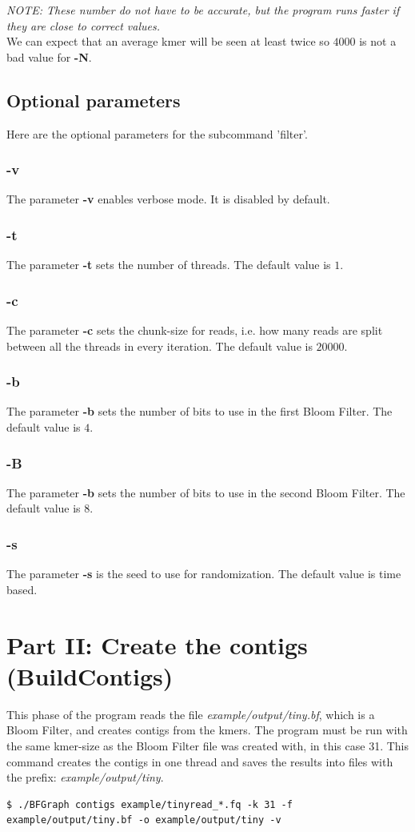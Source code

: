 \documentclass[a4paper]{report}
\renewcommand{\b}[1]{\textbf{#1}}  %
\newcommand{\e}[1]{\emph{#1}}    %
\begin{document}
\textit{NOTE: These number do not have to be accurate, but the program runs faster if they are close to correct values.} \\[4pt]

We can expect that an average kmer will be seen at least twice so $4000$ is not a bad value for \b{-N}.

\subsection{Optional parameters}
Here are the optional parameters for the subcommand 'filter'.

\subsubsection{\b{-v}}
The parameter \b{-v} enables verbose mode. It is disabled by default.
\subsubsection{\b{-t}}
The parameter \b{-t} sets the number of threads. The default value is $1$.
\subsubsection{\b{-c}}
The parameter \b{-c} sets the chunk-size for reads, i.e. how many reads are split between all the threads in every iteration. 
The default value is $20000$.
\subsubsection{\b{-b}}
The parameter \b{-b} sets the number of bits to use in the first Bloom Filter. 
The default value is $4$.
\subsubsection{\b{-B}}
The parameter \b{-b} sets the number of bits to use in the second Bloom Filter. 
The default value is $8$.
\subsubsection{\b{-s}}
The parameter \b{-s} is the seed to use for randomization. The default value is time based.

\newpage
\section{Part II: Create the contigs (BuildContigs)}
This phase of the program reads the file \e{example/output/tiny.bf}, which is a Bloom Filter, and creates contigs from the kmers. 
The program must be run with the same kmer-size as the Bloom Filter file was created with, in this case 31.
This command creates the contigs in one thread and saves the results into files with the prefix: \e{example/output/tiny}.
\footnotesize
\begin{verbatim}
$ ./BFGraph contigs example/tinyread_*.fq -k 31 -f example/output/tiny.bf -o example/output/tiny -v
\end{verbatim}
\normalsize
\end{document}
